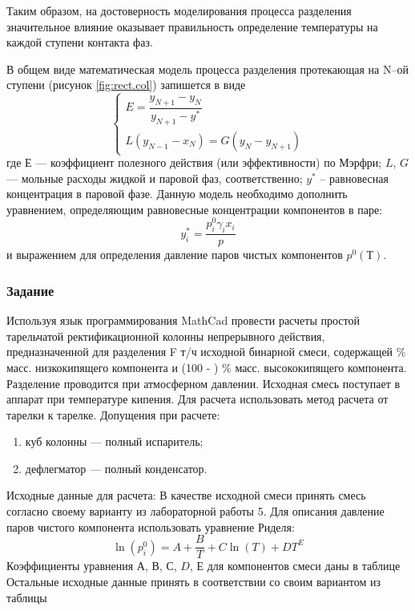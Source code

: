 Таким образом, на достоверность моделирования процесса разделения значительное влияние оказывает правильность определение температуры на каждой ступени контакта фаз.

В общем виде математическая модель процесса разделения протекающая на N--ой ступени (рисунок \ref{fig:rect.col}) запишется в виде
\begin{equation}
\left\lbrace 
\begin{gathered} 
E=\dfrac{y_{N+1}-y_{N}}{y_{N+1}-y^*}\\
L(y_{N-1}-x_N)=G(y_N-y_{N+1})
\end{gathered} 
\right.
\end{equation}
где $Е$ --- коэффициент полезного действия (или эффективности) по Мэрфри; $L$, $G$ --- мольные расходы жидкой и паровой фаз, соответственно; $y^*$ – равновесная концентрация в паровой фазе. Данную модель необходимо дополнить уравнением, определяющим равновесные концентрации компонентов в паре:
\begin{equation}
	y_i^*=\dfrac{p_i^0 \gamma_i x_i}{p}
\end{equation}
и выражением для определения давление паров чистых компонентов $p^0(Т)$.

\subsubsection{Задание}
Используя язык программирования MathCad провести расчеты простой тарельчатой ректификационной колонны непрерывного действия, предназначенной для разделения F т/ч исходной бинарной смеси, содержащей  \% масс. низкокипящего компонента и (100 - ) \% масс. высококипящего компонента. Разделение проводится при атмосферном давлении. Исходная смесь поступает в аппарат при температуре кипения.
Для расчета использовать метод расчета от тарелки к тарелке. Допущения при расчете:
\begin{enumerate}
\item куб колонны --- полный испаритель;
\item дефлегматор --- полный конденсатор.
\end{enumerate}

Исходные данные для расчета:
В качестве исходной смеси принять смесь согласно своему варианту из лабораторной работы 5. Для описания давление паров чистого компонента использовать уравнение Риделя:
\begin{equation}
	\ln (p_i^0)= A + \dfrac{B}{T}  + C \ln(T) + D T^E
\end{equation}
Коэффициенты уравнения $А$, $В$, $С$, $D$, $Е$ для компонентов смеси даны в таблице \ %
Остальные исходные данные принять в соответствии со своим вариантом из таблицы %

